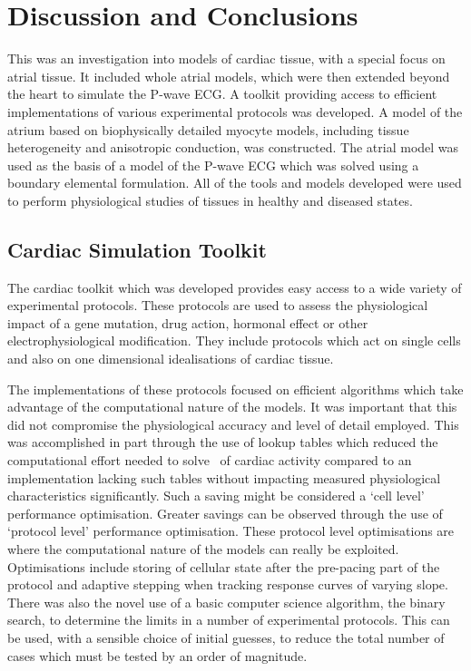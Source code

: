 \chapter{Discussion and Conclusions}


This was an investigation into models of cardiac tissue, with a special focus on
atrial tissue.
It included whole atrial models, which were then extended beyond the heart to
simulate the P-wave ECG.
A toolkit providing access to efficient implementations of various experimental
protocols was developed.
A model of the atrium based on biophysically detailed myocyte models, including tissue heterogeneity and anisotropic
conduction, was constructed.
The atrial model was used as the basis of a model of the P-wave ECG which was
solved using a boundary elemental formulation.
All of the tools and models developed were used to perform physiological
studies of tissues in healthy and diseased states.

\section{Cardiac Simulation Toolkit}

The cardiac toolkit which was developed provides easy access to a wide variety
of experimental protocols.
These protocols are used to assess the physiological impact of a gene mutation,
drug action, hormonal effect or other electrophysiological modification.
They include protocols which act on single cells and also on one dimensional
idealisations of cardiac tissue.

The implementations of these protocols focused on efficient algorithms
which take advantage of the computational nature of the models.
It was important that this did not compromise the physiological accuracy and
level of detail employed.
This was accomplished in part through the use of lookup tables which reduced the
computational effort needed to solve \ of cardiac activity compared to an
implementation lacking such tables without impacting measured physiological
characteristics significantly.
Such a saving might be considered a `cell level' performance optimisation.
Greater savings can be observed through the use of `protocol level' performance
optimisation.
These protocol level optimisations are where the computational nature of the
models can really be exploited.
Optimisations include storing of cellular state after the pre-pacing part of the
protocol and adaptive stepping when tracking response curves of varying slope.
There was also the novel use of a basic computer science algorithm, the binary
search, to determine the limits in a number of experimental protocols.
This can be used, with a sensible choice of initial guesses, to reduce the total
number of cases which must be tested by an order of magnitude.

